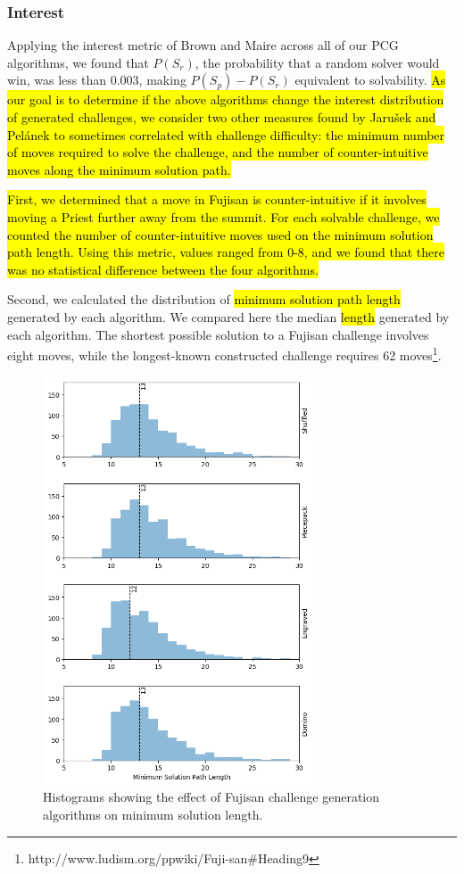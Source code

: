 \documentclass[journal]{IEEEtran}
\begin{document}
\subsubsection{Interest}

Applying the interest metric of Brown and Maire \cite{MCPUZZLE} across all of our PCG algorithms, we found that $P(S_r)$, the probability that a random solver would win, was less than 0.003, making $P(S_p) - P(S_r)$ equivalent to solvability. \hl{As our goal is to determine if the above algorithms change the interest distribution of generated challenges, we consider two other measures found by 
Jaru{\v{s}}ek and Pel{\'a}nek to sometimes correlated with challenge difficulty:
the minimum number of moves required to solve the challenge, and the number of counter-intuitive moves along the minimum solution path.} \cite{jaruvsek2010difficulty}
\cite{jaruvsek2011determines}

\hl{First, we determined that a move in Fujisan is counter-intuitive if it involves moving a Priest further away from the summit. For each solvable challenge, we counted the number of counter-intuitive moves used on the minimum solution path length. Using this metric, values ranged from 0-8, and we found that there was no statistical difference between the four algorithms.}

Second, we calculated the distribution of \hl{minimum solution path length} generated by each algorithm. We compared here the median \hl{length} generated by each algorithm. The shortest possible solution to a Fujisan challenge involves eight moves, while 
the longest-known constructed challenge requires 62 moves\footnote{http://www.ludism.org/ppwiki/Fuji-san\#Heading9}.

\begin{figure}[t]
\centering
\includegraphics[width=8cm]{standalonediff2.png}
\caption{Histograms showing the effect of Fujisan challenge generation algorithms on minimum solution length.}
\label{fig:difficultycomp}
\end{figure}
\end{document}
